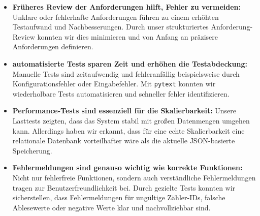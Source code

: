 \begin{itemize}
    \item \textbf{Früheres Review der Anforderungen hilft, Fehler zu vermeiden:} Unklare oder fehlerhafte Anforderungen führen zu einem erhöhten Testaufwand und Nachbesserungen.
    Durch unser strukturiertes Anforderung-Review konnten wir dies minimieren und von Anfang an präzisere Anforderungen definieren.
    \item \textbf{automatisierte Tests sparen Zeit und erhöhen die Testabdeckung:} Manuelle Tests sind zeitaufwendig und fehleranfällig beispielsweise durch Konfigurationsfehler oder Eingabefehler.
    Mit \texttt{pytext} konnten wir wiederholbare Tests automatisieren und schneller fehler identifizieren.
    \item \textbf{Performance-Tests sind essenziell für die Skalierbarkeit:} Unsere Lasttests zeigten, dass das System stabil mit großen Datenmengen umgehen kann.
    Allerdings haben wir erkannt, dass für eine echte Skalierbarkeit eine relationale Datenbank vorteilhafter wäre als die aktuelle JSON-basierte Speicherung.
    \item \textbf{Fehlermeldungen sind genauso wichtig wie korrekte Funktionen:} Nicht nur fehlerfreie Funktionen, sondern auch verständliche Fehlermeldungen tragen zur Benutzerfreundlichkeit bei.
    Durch gezielte Tests konnten wir sicherstellen, dass Fehlermeldungen für ungültige Zähler-IDs, falsche Ablesewerte oder negative Werte klar und nachvollziehbar sind.
\end{itemize}
